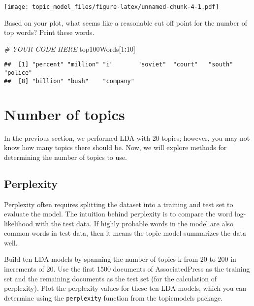 \documentclass[]{article}
\newenvironment{Shaded}{\begin{snugshade}}{\end{snugshade}}
\newcommand{\CommentTok}[1]{\textcolor[rgb]{0.56,0.35,0.01}{\textit{#1}}}
\newcommand{\DecValTok}[1]{\textcolor[rgb]{0.00,0.00,0.81}{#1}}
\newcommand{\NormalTok}[1]{#1}
\newcommand{\OperatorTok}[1]{\textcolor[rgb]{0.81,0.36,0.00}{\textbf{#1}}}
\begin{document}
\texttt{[image: topic\_model\_files/figure-latex/unnamed-chunk-4-1.pdf]}

Based on your plot, what seems like a reasonable cut off point for the
number of top words? Print these words.

\begin{Shaded}
\begin{Highlighting}[]
\CommentTok{# YOUR CODE HERE}
\NormalTok{top100Words[}\DecValTok{1}\OperatorTok{:}\DecValTok{10}\NormalTok{]}
\end{Highlighting}
\end{Shaded}

\begin{verbatim}
##  [1] "percent" "million" "i"       "soviet"  "court"   "south"   "police" 
##  [8] "billion" "bush"    "company"
\end{verbatim}

\hypertarget{number-of-topics}{%
\section{Number of topics}\label{number-of-topics}}

In the previous section, we performed LDA with 20 topics; however, you
may not know how many topics there should be. Now, we will explore
methods for determining the number of topics to use.

\hypertarget{perplexity}{%
\subsection{Perplexity}\label{perplexity}}

Perplexity often requires splitting the dataset into a training and test
set to evaluate the model. The intuition behind perplexity is to compare
the word log-likelihood with the test data. If highly probable words in
the model are also common words in test data, then it means the topic
model summarizes the data well.

Build ten LDA models by spanning the number of topics k from 20 to 200
in increments of 20. Use the first 1500 documents of AssociatedPress as
the training set and the remaining documents as the test set (for the
calculation of perplexity). Plot the perplexity values for these ten LDA
models, which you can determine using the \texttt{perplexity} function
from the topicmodels package.
\end{document}
